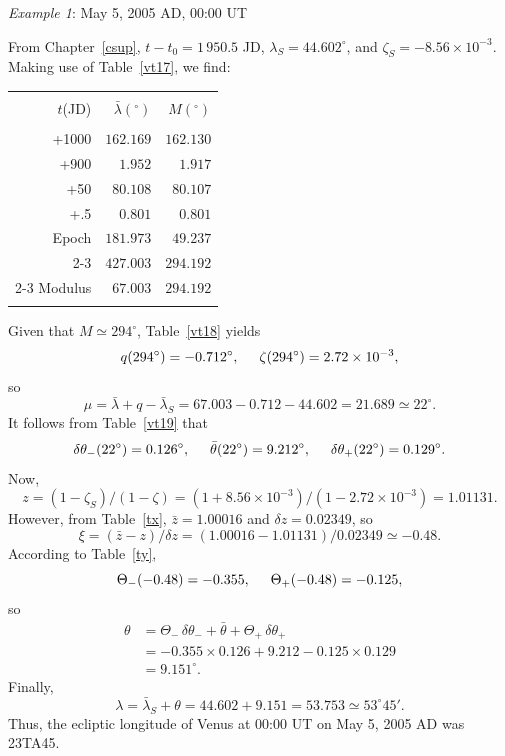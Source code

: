\begin{center}
 {\em Example 1}: May 5,  2005 AD, 00:00 UT
 \end{center}
From Chapter~\ref{csup}, $t-t_0=1\,950.5$ JD, $\lambda_S= 44.602^\circ$, and
$\zeta_S= -8.56\times 10^{-3}$. Making use of
Table~\ref{vt17}, we find:
\begin{center}
\begin{tabular}{rrr}
&&\\
$t$(JD) & $ \bar{\lambda}(^\circ)$ & $M(^\circ)$\\[-2ex]
&&\\
+1000 & $162.169$ & $162.130$\\
+900 & $1.952$ & $1.917$\\
+50 & $80.108$ & $80.107$\\
+.5 & $0.801$ & $0.801$\\
Epoch & $181.973$ & $49.237$\\\cline{2-3}
&$427.003$ & $294.192$\\\cline{2-3}
Modulus & $67.003$ & $294.192$\\ 
&&\\
\end{tabular}
\end{center}
Given that $M\simeq 294^\circ$, Table~\ref{vt18} yields 
$$
q(294^\circ)= -0.712^\circ, \mbox{\hspace{0.5cm}}\zeta(294^\circ)=2.72\times 10^{-3},
$$
so
$$
\mu=\bar{\lambda}+q-\bar{\lambda}_S = 67.003-0.712-44.602= 21.689\simeq
22^\circ.
$$
It follows from Table~\ref{vt19}
that 
$$
\delta\theta_-(22^\circ) = 0.126^\circ,\mbox{\hspace{0.5cm}}\bar{\theta}(22^\circ)=9.212^\circ, \mbox{\hspace{0.5cm}}\delta\theta_+(22^\circ) = 0.129^\circ.
$$
Now, 
$$
z= (1-\zeta_S)/(1-\zeta) = (1+8.56\times 10^{-3})/(1-2.72\times 10^{-3}) =
1.01131.
$$
However, from Table~\ref{tx}, $\bar{z}= 1.00016$ and $\delta z = 0.02349$, so
$$
\xi = (\bar{z}-z)/\delta z = (1.00016-1.01131)/0.02349 \simeq -0.48.
$$
According to Table~\ref{ty}, 
$$
\Theta_-(-0.48) = -0.355, \mbox{\hspace{0.5cm}}\Theta_+(-0.48) = -0.125,
$$
so
\begin{align*}
\theta  &= \Theta_-\,\delta\theta_- + \bar{\theta}+\Theta_+\,\delta\theta_+ \\[0.5ex]
&= -0.355\times 0.126 + 9.212-0.125\times 0.129\\[0.5ex]
& = 9.151^\circ.
\end{align*}
Finally,
$$
\lambda=\bar{\lambda}_S + \theta= 44.602+9.151=53.753 \simeq 53^\circ 45'. 
$$
Thus,
the ecliptic longitude of Venus at 00:00 UT on May 5, 2005 AD was 23TA45.

